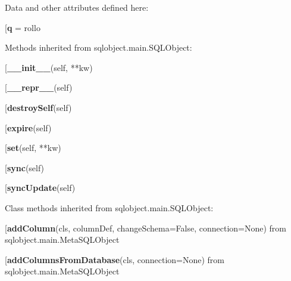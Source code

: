 Data and other attributes defined here:\\
\begin{description}\item[{\bf q} = rollo\end{description}


Methods inherited from sqlobject.main.SQLObject:\\
\begin{description}\item[{\bf \_\_init\_\_}(self, **kw)\end{description}

\begin{description}\item[{\bf \_\_repr\_\_}(self)\end{description}

\begin{description}\item[{\bf destroySelf}(self)\end{description}

\begin{description}\item[{\bf expire}(self)\end{description}

\begin{description}\item[{\bf set}(self, **kw)\end{description}

\begin{description}\item[{\bf sync}(self)\end{description}

\begin{description}\item[{\bf syncUpdate}(self)\end{description}


Class methods inherited from sqlobject.main.SQLObject:\\
\begin{description}\item[{\bf addColumn}(cls, columnDef, changeSchema=False, connection=None) from sqlobject.main.MetaSQLObject\end{description}

\begin{description}\item[{\bf addColumnsFromDatabase}(cls, connection=None) from sqlobject.main.MetaSQLObject\end{description}

